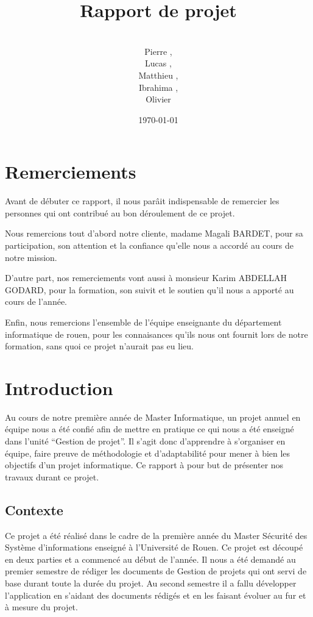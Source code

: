 \documentclass{../res/univ-projet}
\title{Rapport de projet}
\author{\\ Pierre \bsc{Balmelle},\\ Lucas \bsc{Barbay}, \\ Matthieu \bsc{Fin},\\ Ibrahima \bsc{Sorry Barry},\\ Olivier \bsc{Thibault}}
\date{\today}
\begin{document}
\maketitle
\newpage
\section{Remerciements}
Avant de débuter ce rapport, il nous parâit indispensable de remercier les personnes qui ont contribué au bon déroulement de ce projet.

Nous remercions tout d'abord notre cliente, madame Magali BARDET, pour sa participation, son attention et la confiance qu'elle nous a accordé au 
cours de notre mission.

D'autre part, nos remerciements vont aussi à monsieur Karim ABDELLAH GODARD, pour la formation, son suivit et le soutien qu'il nous a apporté au cours de l'année.

Enfin, nous remercions l'ensemble de l'équipe enseignante du département informatique de rouen, pour les connaisances qu'ils nous ont fournit lors de notre formation,
sans quoi ce projet n'aurait pas eu lieu.
\newpage
\tableofcontents

\newpage

\section{Introduction}

Au cours de notre première année de Master Informatique, un projet annuel en équipe nous a été confié afin de mettre en pratique ce qui nous a 
été enseigné dans l'unité ``Gestion de projet''. Il s'agit donc d'apprendre à s'organiser en équipe, faire preuve de méthodologie et d'adaptabilité pour mener 
à bien les objectifs d'un projet informatique. Ce rapport à pour but de présenter nos travaux durant ce projet.



  \subsection{Contexte}
  Ce projet a été réalisé dans le cadre de la première année du Master Sécurité des Système d'informations enseigné à  l'Université de Rouen. Ce projet est découpé en deux parties et a commencé au début de l'année. Il nous a été demandé au premier semestre de rédiger les documents de Gestion de projets qui ont servi de base durant toute la durée du projet. Au second semestre il a fallu développer l'application en s'aidant des documents rédigés et en les faisant évoluer au fur et à mesure du projet.
\end{document}
